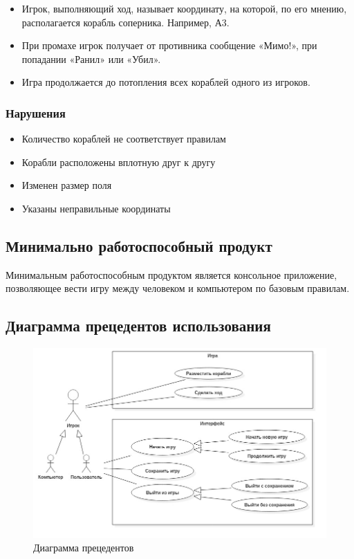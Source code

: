 \documentclass[a4paper]{article}
\begin{document}
\begin{itemize}

\item Игрок, выполняющий ход, называет координату, на которой, по его мнению, располагается корабль соперника. Например, А3.
\item При промахе игрок получает от противника сообщение «Мимо!», при попадании «Ранил» или «Убил».
\item Игра продолжается до потопления всех кораблей одного из игроков.

\end{itemize}

\subsubsection{Нарушения}

\begin{itemize}

\item Количество кораблей не соответствует правилам
\item Корабли расположены вплотную друг к другу
\item Изменен размер поля
\item Указаны неправильные координаты

\end{itemize}

\subsection{Минимально работоспособный продукт}

Минимальным работоспособным продуктом является консольное приложение, позволяющее вести игру между человеком и компьютером по базовым правилам.

\subsection{Диаграмма прецедентов использования}

\begin{figure}[H]
	\begin{center}
		\includegraphics[scale=0.7]{Diagrams/UseCaseDiagram.png}
		\caption{Диаграмма прецедентов} 
		\label{pic:pic_name} %
	\end{center}
\end{figure}
\end{document}
